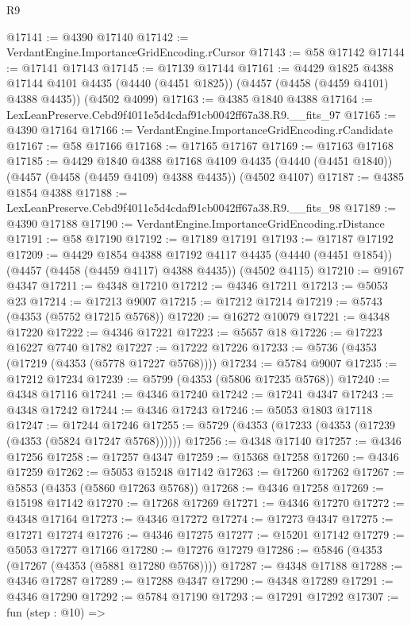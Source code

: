 \begin{lexlean}{R9}
\begin{coremodule}
@17141 := @4390 @17140
@17142 := VerdantEngine.ImportanceGridEncoding.rCursor
@17143 := @58 @17142
@17144 := @17141 @17143
@17145 := @17139 @17144
@17161 := @4429
    @1825
    @4388
    @17144
    @4101
    @4435
    (@4440 (@4451 @1825))
    (@4457 (@4458 (@4459 @4101) @4388 @4435))
    (@4502 @4099)
@17163 := @4385 @1840 @4388
@17164 := LexLeanPreserve.Cebd9f4011e5d4cdaf91cb0042ff67a38.R9.__fits_97
@17165 := @4390 @17164
@17166 := VerdantEngine.ImportanceGridEncoding.rCandidate
@17167 := @58 @17166
@17168 := @17165 @17167
@17169 := @17163 @17168
@17185 := @4429
    @1840
    @4388
    @17168
    @4109
    @4435
    (@4440 (@4451 @1840))
    (@4457 (@4458 (@4459 @4109) @4388 @4435))
    (@4502 @4107)
@17187 := @4385 @1854 @4388
@17188 := LexLeanPreserve.Cebd9f4011e5d4cdaf91cb0042ff67a38.R9.__fits_98
@17189 := @4390 @17188
@17190 := VerdantEngine.ImportanceGridEncoding.rDistance
@17191 := @58 @17190
@17192 := @17189 @17191
@17193 := @17187 @17192
@17209 := @4429
    @1854
    @4388
    @17192
    @4117
    @4435
    (@4440 (@4451 @1854))
    (@4457 (@4458 (@4459 @4117) @4388 @4435))
    (@4502 @4115)
@17210 := @9167 @4347
@17211 := @4348 @17210
@17212 := @4346 @17211
@17213 := @5053 @23
@17214 := @17213 @9007
@17215 := @17212 @17214
@17219 := @5743 (@4353 (@5752 @17215 @5768))
@17220 := @16272 @10079
@17221 := @4348 @17220
@17222 := @4346 @17221
@17223 := @5657 @18
@17226 := @17223 @16227 @7740 @1782
@17227 := @17222 @17226
@17233 := @5736 (@4353 (@17219 (@4353 (@5778 @17227 @5768))))
@17234 := @5784 @9007
@17235 := @17212 @17234
@17239 := @5799 (@4353 (@5806 @17235 @5768))
@17240 := @4348 @17116
@17241 := @4346 @17240
@17242 := @17241 @4347
@17243 := @4348 @17242
@17244 := @4346 @17243
@17246 := @5053 @1803 @17118
@17247 := @17244 @17246
@17255 := @5729 (@4353 (@17233 (@4353 (@17239 (@4353 (@5824 @17247 @5768))))))
@17256 := @4348 @17140
@17257 := @4346 @17256
@17258 := @17257 @4347
@17259 := @15368 @17258
@17260 := @4346 @17259
@17262 := @5053 @15248 @17142
@17263 := @17260 @17262
@17267 := @5853 (@4353 (@5860 @17263 @5768))
@17268 := @4346 @17258
@17269 := @15198 @17142
@17270 := @17268 @17269
@17271 := @4346 @17270
@17272 := @4348 @17164
@17273 := @4346 @17272
@17274 := @17273 @4347
@17275 := @17271 @17274
@17276 := @4346 @17275
@17277 := @15201 @17142
@17279 := @5053 @17277 @17166
@17280 := @17276 @17279
@17286 := @5846 (@4353 (@17267 (@4353 (@5881 @17280 @5768))))
@17287 := @4348 @17188
@17288 := @4346 @17287
@17289 := @17288 @4347
@17290 := @4348 @17289
@17291 := @4346 @17290
@17292 := @5784 @17190
@17293 := @17291 @17292
@17307 := fun (step : @10) =>

\end{coremodule}
\end{lexlean}
